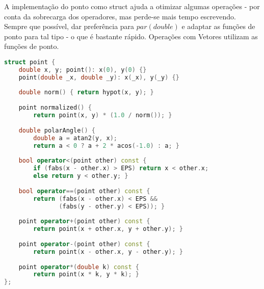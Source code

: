 A implementação do ponto como struct ajuda a otimizar algumas operações - por conta da sobrecarga dos operadores, mas perde-se mais tempo escrevendo. Sempre que possível, dar preferência para $par(double)$ e adaptar as funções de ponto para tal tipo - o que é bastante rápido. Operações com Vetores utilizam as funções de ponto.

\begin{lstlisting}[language=C++, title=Parte 1: Estrutura]
struct point {
    double x, y; point(): x(0), y(0) {}
    point(double _x, double _y): x(_x), y(_y) {}
    
    double norm() { return hypot(x, y); }
    
    point normalized() {
        return point(x, y) * (1.0 / norm()); }
        
    double polarAngle() {
		double a = atan2(y, x);
		return a < 0 ? a + 2 * acos(-1.0) : a; }
		
	bool operator<(point other) const {
		if (fabs(x - other.x) > EPS) return x < other.x;
		else return y < other.y; }
    
	bool operator==(point other) const {
		return (fabs(x - other.x) < EPS && 
		       (fabs(y - other.y) < EPS)); }
    
	point operator+(point other) const {
		return point(x + other.x, y + other.y); }
    
	point operator-(point other) const {
		return point(x - other.x, y - other.y); }
		
	point operator*(double k) const {
		return point(x * k, y * k); }
};
\end{lstlisting}

\newpage

